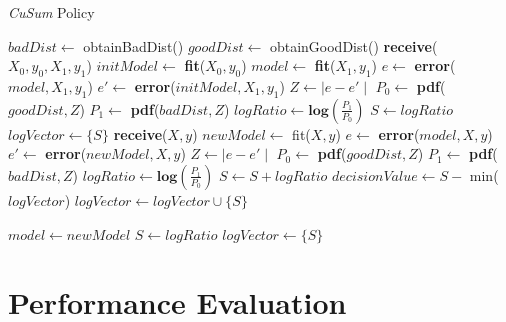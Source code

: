 \documentclass{mpaper}
\begin{document}

\begin{algorithm}[!h]
\caption{\textit{CuSum} Policy}\label{polCusum}
\begin{algorithmic}
\State $badDist \gets$ obtainBadDist() 
\State $goodDist \gets$ obtainGoodDist() 
\State \textbf{receive}($X_0, y_0, X_1, y_1$)
\State $initModel \gets$ \textbf{fit}($X_0, y_0$)
\State $model \gets$ \textbf{fit}($X_1, y_1$)
\State $e \gets$ \textbf{error}($model,X_1,y_1$)
\State $e' \gets$ \textbf{error}($initModel,X_1,y_1$)
\State $Z \gets \mid e - e' \mid$
\State $P_0 \gets$ \textbf{pdf}($goodDist,Z$)
\State $P_1 \gets$ \textbf{pdf}($badDist,Z$)
\State $logRatio \gets \textbf{log}(\frac{P_1}{P_0})$
\State $S \gets logRatio$
\State $logVector \gets \{S\}$
    \State \textbf{receive}($X, y$)
    \State $newModel \gets$ fit($X,y$)
    \State $e \gets$ \textbf{error}($model,X,y$)
    \State $e' \gets$ \textbf{error}($newModel,X,y$)
    \State $Z \gets \mid e - e' \mid$
    \State $P_0 \gets$ \textbf{pdf}($goodDist, Z$)
    \State $P_1 \gets$ \textbf{pdf}($badDist, Z$)
    \State $logRatio \gets \textbf{log}(\frac{P_1}{P_0})$
    \State $S \gets S + logRatio$
    \State $decisionValue \gets S - $ min($logVector$)
    \State $logVector\gets logVector \cup \{S\}$

        \State $model \gets newModel$ 
        \State $S \gets logRatio$
        \State $logVector \gets \{S\}$
    \EndIf
\EndWhile
\end{algorithmic}
\end{algorithm}
\newpage
\section{Performance Evaluation}
\end{document}
